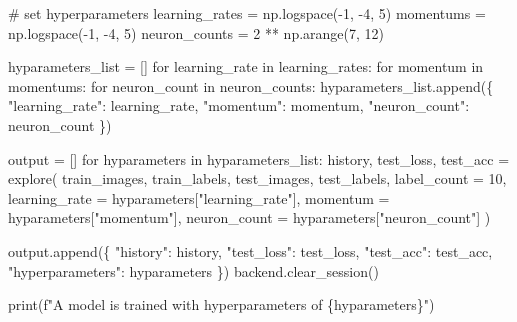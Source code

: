 \documentclass[
  letterpaper,
  DIV=11,
  numbers=noendperiod]{scrreprt}
\newenvironment{Shaded}{\begin{snugshade}}{\end{snugshade}}
\newcommand{\BuiltInTok}[1]{\textcolor[rgb]{0.00,0.23,0.31}{#1}}
\newcommand{\CommentTok}[1]{\textcolor[rgb]{0.37,0.37,0.37}{#1}}
\newcommand{\ControlFlowTok}[1]{\textcolor[rgb]{0.00,0.23,0.31}{#1}}
\newcommand{\DecValTok}[1]{\textcolor[rgb]{0.68,0.00,0.00}{#1}}
\newcommand{\KeywordTok}[1]{\textcolor[rgb]{0.00,0.23,0.31}{#1}}
\newcommand{\NormalTok}[1]{\textcolor[rgb]{0.00,0.23,0.31}{#1}}
\newcommand{\OperatorTok}[1]{\textcolor[rgb]{0.37,0.37,0.37}{#1}}
\newcommand{\SpecialCharTok}[1]{\textcolor[rgb]{0.37,0.37,0.37}{#1}}
\newcommand{\SpecialStringTok}[1]{\textcolor[rgb]{0.13,0.47,0.30}{#1}}
\newcommand{\StringTok}[1]{\textcolor[rgb]{0.13,0.47,0.30}{#1}}
\begin{document}
\begin{Shaded}
\begin{Highlighting}[]
\CommentTok{\# set hyperparameters}
\NormalTok{learning\_rates }\OperatorTok{=}\NormalTok{ np.logspace(}\OperatorTok{{-}}\DecValTok{1}\NormalTok{, }\OperatorTok{{-}}\DecValTok{4}\NormalTok{, }\DecValTok{5}\NormalTok{)}
\NormalTok{momentums }\OperatorTok{=}\NormalTok{ np.logspace(}\OperatorTok{{-}}\DecValTok{1}\NormalTok{, }\OperatorTok{{-}}\DecValTok{4}\NormalTok{, }\DecValTok{5}\NormalTok{)}
\NormalTok{neuron\_counts }\OperatorTok{=} \DecValTok{2} \OperatorTok{**}\NormalTok{ np.arange(}\DecValTok{7}\NormalTok{, }\DecValTok{12}\NormalTok{)}

\NormalTok{hyparameters\_list }\OperatorTok{=}\NormalTok{ []}
\ControlFlowTok{for}\NormalTok{ learning\_rate }\KeywordTok{in}\NormalTok{ learning\_rates:}
    \ControlFlowTok{for}\NormalTok{ momentum }\KeywordTok{in}\NormalTok{ momentums:}
        \ControlFlowTok{for}\NormalTok{ neuron\_count }\KeywordTok{in}\NormalTok{ neuron\_counts:}
\NormalTok{            hyparameters\_list.append(\{}
                \StringTok{"learning\_rate"}\NormalTok{: learning\_rate,}
                \StringTok{"momentum"}\NormalTok{: momentum,}
                \StringTok{"neuron\_count"}\NormalTok{: neuron\_count}
\NormalTok{            \})}
\end{Highlighting}
\end{Shaded}

\begin{Shaded}
\begin{Highlighting}[]
\NormalTok{output }\OperatorTok{=}\NormalTok{ []}
\ControlFlowTok{for}\NormalTok{ hyparameters }\KeywordTok{in}\NormalTok{ hyparameters\_list:}
\NormalTok{    history, test\_loss, test\_acc }\OperatorTok{=}\NormalTok{ explore(}
\NormalTok{        train\_images,}
\NormalTok{        train\_labels,}
\NormalTok{        test\_images,}
\NormalTok{        test\_labels,}
\NormalTok{        label\_count }\OperatorTok{=} \DecValTok{10}\NormalTok{,}
\NormalTok{        learning\_rate }\OperatorTok{=}\NormalTok{ hyparameters[}\StringTok{"learning\_rate"}\NormalTok{],}
\NormalTok{        momentum }\OperatorTok{=}\NormalTok{ hyparameters[}\StringTok{"momentum"}\NormalTok{],}
\NormalTok{        neuron\_count }\OperatorTok{=}\NormalTok{ hyparameters[}\StringTok{"neuron\_count"}\NormalTok{]}
\NormalTok{    )}
    
\NormalTok{    output.append(\{}
        \StringTok{"history"}\NormalTok{: history,}
        \StringTok{"test\_loss"}\NormalTok{: test\_loss, }
        \StringTok{"test\_acc"}\NormalTok{: test\_acc,}
        \StringTok{"hyperparameters"}\NormalTok{: hyparameters}
\NormalTok{    \})}
\NormalTok{    backend.clear\_session()}

    \BuiltInTok{print}\NormalTok{(}\SpecialStringTok{f"A model is trained with hyperparameters of }\SpecialCharTok{\{}\NormalTok{hyparameters}\SpecialCharTok{\}}\SpecialStringTok{"}\NormalTok{)}
\end{Highlighting}
\end{Shaded}
\end{document}
